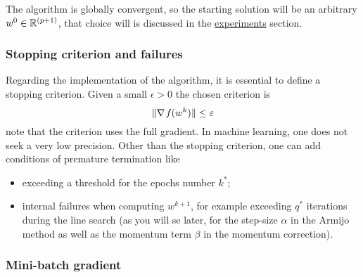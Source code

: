 The algorithm is globally convergent, so the starting solution will be an arbitrary $w^0\in\mathbb{R}^{(p+1)}$, that choice will is discussed in the \hyperref[sc:exp]{experiments} section.

\subsubsection*{Stopping criterion and failures}

Regarding the implementation of the algorithm, it is essential to define a stopping criterion. Given a small $\epsilon>0$ the chosen criterion is
\begin{equation}\label{eq:stopping}
\lVert\nabla\operatorname*{\mathit{f}}(w^k)\rVert\leq\varepsilon
\end{equation}
note that the criterion uses the full gradient. In machine learning, one does not seek a very low precision. Other than the stopping criterion, one can add conditions of premature termination like
\begin{itemize}
\item exceeding a threshold for the epochs number $k^\ast$;%
\item internal failures when computing $w^{k+1}$, for example exceeding $q^\ast$ iterations during the line search (as you will se later, for the step-size $\alpha$ in the Armijo method as well as the momentum term $\beta$ in the momentum correction).
\end{itemize}


\subsubsection*{Mini-batch gradient}

